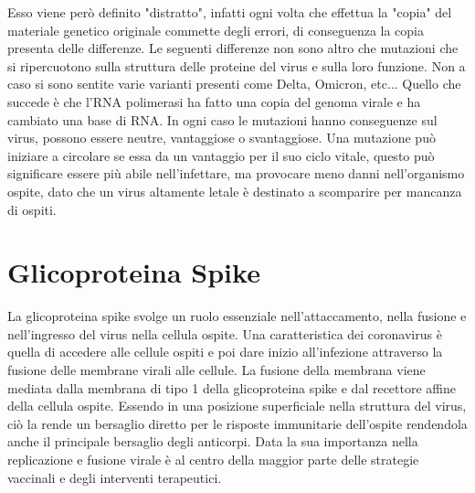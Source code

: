 Esso viene però definito "distratto", infatti ogni volta che effettua la "copia" del materiale genetico originale commette degli errori, di conseguenza la copia presenta delle differenze. Le seguenti differenze non sono altro che mutazioni che si ripercuotono sulla struttura delle proteine del virus e sulla loro funzione. Non a caso si sono sentite varie varianti presenti come Delta, Omicron, etc... Quello che succede è che l'RNA polimerasi ha fatto una copia del genoma virale e ha cambiato una base di RNA. In ogni caso le mutazioni hanno conseguenze sul virus, possono essere neutre, vantaggiose o svantaggiose. Una mutazione può iniziare a circolare se essa da un vantaggio per il suo ciclo vitale, questo può significare essere più abile nell'infettare, ma provocare meno danni nell'organismo ospite, dato che un virus altamente letale è destinato a scomparire per mancanza di ospiti.

\section{Glicoproteina Spike}\label{sec:cap_sec_subsec}
La glicoproteina spike svolge un ruolo essenziale nell'attaccamento, nella fusione e nell'ingresso del virus nella cellula ospite. Una caratteristica dei coronavirus è quella di accedere alle cellule ospiti e poi dare inizio all'infezione attraverso la fusione delle membrane virali alle cellule. La fusione della membrana viene mediata dalla membrana di tipo 1 della glicoproteina spike e dal recettore affine della cellula ospite. Essendo in una posizione superficiale nella struttura del virus, ciò la rende un bersaglio diretto per le risposte immunitarie dell'ospite rendendola anche il principale bersaglio degli anticorpi. Data la sua importanza nella replicazione e fusione virale è al centro della maggior parte delle strategie vaccinali e degli interventi terapeutici. 

